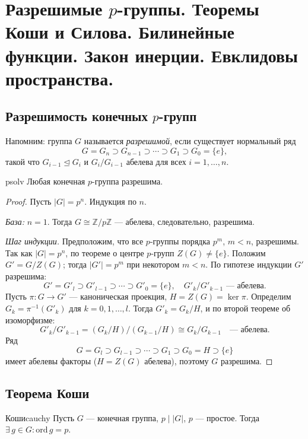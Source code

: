 
\section{Разрешимые $p$-группы. Теоремы Коши и Силова. Билинейные функции. Закон инерции. Евклидовы пространства.}

\subsection{Разрешимость конечных $p$-групп}

Напомним: группа $G$ называется \textit{разрешимой}, если существует нормальный ряд
\[
G = G_n \supset G_{n-1} \supset \cdots \supset G_1 \supset G_0 = \{e\},
\]
такой что $G_{i-1} \trianglelefteq G_i$ и $G_i/G_{i-1}$ абелева для всех $i = 1, \ldots, n$.

\begin{Theorem}{}{psolv}
	Любая конечная $p$-группа разрешима.
\end{Theorem}

\begin{proof}
	Пусть $|G| = p^n$. Индукция по $n$.
	
	\textit{База:} $n = 1$. Тогда $G \cong \mathbb{Z}/p\mathbb{Z}$ — абелева, следовательно, разрешима.
	
	\textit{Шаг индукции.} Предположим, что все $p$-группы порядка $p^m$, $m < n$, разрешимы.
	Так как $|G| = p^n$, по теореме о центре $p$-групп $Z(G) \neq \{e\}$.
	Положим $G' = G/Z(G)$; тогда $|G'| = p^m$ при некотором $m < n$.
	По гипотезе индукции $G'$ разрешима:
	\[
	G' = G'_l \supset G'_{l-1} \supset \cdots \supset G'_0 = \{e\}, \quad G'_k/G'_{k-1} \text{ — абелева.}
	\]
	Пусть $\pi \colon G \to G'$ — каноническая проекция, $H = Z(G) = \ker\pi$.
	Определим $G_k = \pi^{-1}(G'_k)$ для $k = 0, 1, \ldots, l$. Тогда $G'_k = G_k/H$, и по второй теореме об изоморфизме:
	\[
	G'_k/G'_{k-1} = (G_k/H)\big/(G_{k-1}/H) \cong G_k/G_{k-1} \quad \text{— абелева.}
	\]
	Ряд
	\[
	G = G_l \supset G_{l-1} \supset \cdots \supset G_1 \supset G_0 = H \supset \{e\}
	\]
	имеет абелевы факторы ($H = Z(G)$ абелева), поэтому $G$ разрешима.
\end{proof}

\subsection{Теорема Коши}

\begin{Theorem}{Коши}{cauchy}
	Пусть $G$ — конечная группа, $p \mid |G|$, $p$ — простое. Тогда $\exists\, g \in G\colon \mathrm{ord}\, g = p$.
\end{Theorem}

